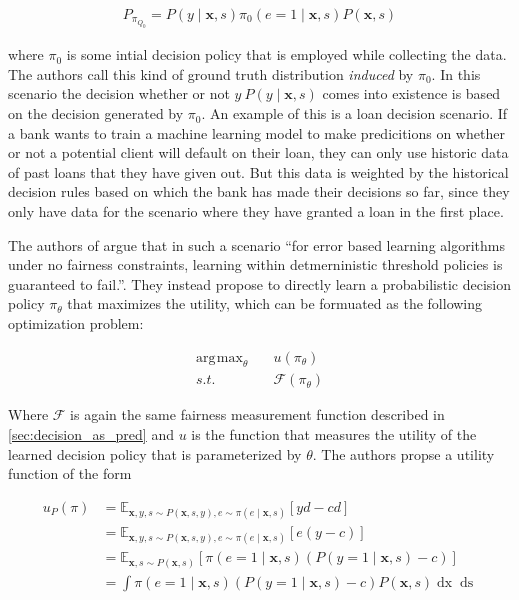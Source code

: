 \documentclass[
	a4paper,
	11pt
	]{article}
\DeclareMathOperator*{\argmax}{\arg\!\max}
\begin{document}
\begin{align*}
    P_{\pi_{Q_{0}}} = P(y \mid \boldsymbol{x}, s)\pi_{0}(e = 1 \mid \boldsymbol{x}, s)P(\boldsymbol{x}, s)
\end{align*}

where $\pi_{0}$ is some intial decision policy that is employed while collecting the data. The authors call this kind of ground truth distribution \textit{induced} by $\pi_0$. In this scenario the decision whether or not $y ~ P(y \mid \boldsymbol{x}, s)$ comes into existence is based on the decision generated by $\pi_{0}$. An example of this is a loan decision scenario. If a bank wants to train a machine learning model to make predicitions on whether or not a potential client will default on their loan, they can only use historic data of past loans that they have given out. But this data is weighted by the historical decision rules based on which the bank has made their decisions so far, since they only have data for the scenario where they have granted a loan in the first place.

The authors of \cite{Kilbertus19} argue that in such a scenario \enquote{for error based learning algorithms under no fairness constraints, learning within detmerninistic threshold policies is guaranteed to fail.}. They instead propose to directly learn a probabilistic decision policy $\pi_{\theta}$ that maximizes the utility, which can be formuated as the following optimization problem:

\begin{align*}
    \argmax_{\theta} &\quad u(\pi_{\theta}) \\
    s.t. &\quad \mathcal{F}(\pi_{\theta})
\end{align*}

Where $\mathcal{F}$ is again the same fairness measurement function described in \ref{sec:decision_as_pred} and $u$ is the function that measures the utility of the learned decision policy that is parameterized by $\theta$. The authors propse a utility function of the form 

\begin{align*}
    u_P(\pi) &= \mathbb{E}_{\boldsymbol{x},y,s \sim P(\boldsymbol{x}, s, y), e \sim \pi(e \mid \boldsymbol{x}, s)}[yd - cd] \\
    &= \mathbb{E}_{\boldsymbol{x},y,s \sim P(\boldsymbol{x}, s, y), e \sim \pi(e \mid \boldsymbol{x}, s)}[e(y - c)] \\
    &= \mathbb{E}_{\boldsymbol{x},s \sim P(\boldsymbol{x}, s)}[\pi(e = 1 \mid \boldsymbol{x}, s)(P(y = 1 \mid \boldsymbol{x}, s) - c)] \\
    &= \int \pi(e = 1 \mid \boldsymbol{x}, s)(P(y = 1 \mid \boldsymbol{x}, s) - c)P(\boldsymbol{x}, s) \mathop{dx} \mathop{ds}
\end{align*}
\end{document}
